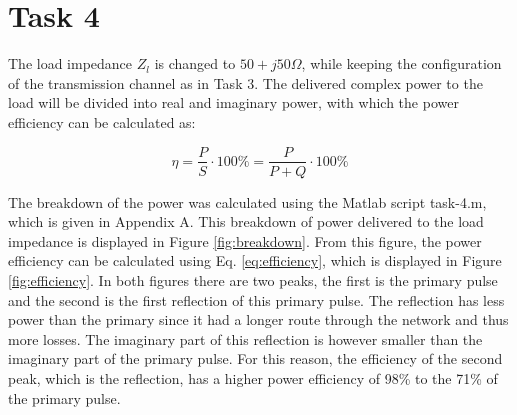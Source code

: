 \documentclass[final]{scrreprt} %
\begin{document}
\section{Task 4}
The load impedance $Z_l$ is changed to $50 + j50 \Omega$, while keeping the configuration of the transmission channel as in Task 3. The delivered complex power to the load will be divided into real and imaginary power, with which the power efficiency can be calculated as:

\begin{equation}
	\eta = \frac{P}{S} \cdot 100\% = \frac{P}{P + Q} \cdot 100\%
	\label{eq:efficiency}
\end{equation}

The breakdown of the power was calculated using the Matlab script task-4.m, which is given in Appendix A. This breakdown of power delivered to the load impedance is displayed in Figure \ref{fig:breakdown}. From this figure, the power efficiency can be calculated using Eq. \ref{eq:efficiency}, which is displayed in Figure \ref{fig:efficiency}. In both figures there are two peaks, the first is the primary pulse and the second is the first reflection of this primary pulse. The reflection has less power than the primary since it had a longer route through the network and thus more losses. The imaginary part of this reflection is however smaller than the imaginary part of the primary pulse. For this reason, the efficiency of the second peak, which is the reflection, has a higher power efficiency of 98\% to the 71\% of the primary pulse.

\iffalse
\begin{figure}[H]
	\centering
	\setlength\figureheight{4cm}
    	\setlength\figurewidth{0.8\linewidth}
	
	\label{fig:breakdown}
	\caption{Breakdown of the delivered powers.}
\end{figure}

\begin{figure}[H]
	\centering
	\setlength\figureheight{4cm}
    	\setlength\figurewidth{0.8\linewidth}
	
	\label{fig:efficiency}
	\caption{Power efficiency.}
\end{figure}
\fi
\end{document}
